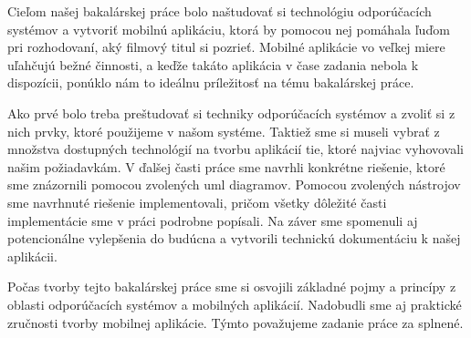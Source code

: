 Cieľom našej bakalárskej práce bolo naštudovať si technológiu odporúčacích systémov a vytvoriť mobilnú aplikáciu, ktorá by pomocou nej pomáhala ľuďom pri rozhodovaní, aký filmový titul si pozrieť. Mobilné aplikácie vo veľkej miere uľahčujú bežné činnosti, a keďže takáto aplikácia v čase zadania nebola k dispozícii, ponúklo nám to ideálnu príležitosť na tému bakalárskej práce.

Ako prvé bolo treba preštudovať si techniky odporúčacích systémov a zvoliť si z nich prvky, ktoré použijeme v našom systéme. Taktiež sme si museli vybrať z množstva dostupných technológií na tvorbu aplikácií tie, ktoré najviac vyhovovali našim požiadavkám. V ďalšej časti práce sme navrhli konkrétne riešenie, ktoré sme znázornili pomocou zvolených \acrshort{uml} diagramov. Pomocou zvolených nástrojov sme navrhnuté riešenie implementovali, pričom všetky dôležité časti implementácie sme v práci podrobne popísali. Na záver sme spomenuli aj potencionálne vylepšenia do budúcna a vytvorili technickú dokumentáciu k našej aplikácii.

Počas tvorby tejto bakalárskej práce sme si osvojili základné pojmy a princípy z oblasti odporúčacích systémov a mobilných aplikácií. Nadobudli sme aj praktické zručnosti tvorby mobilnej aplikácie. Týmto považujeme zadanie práce za splnené.
